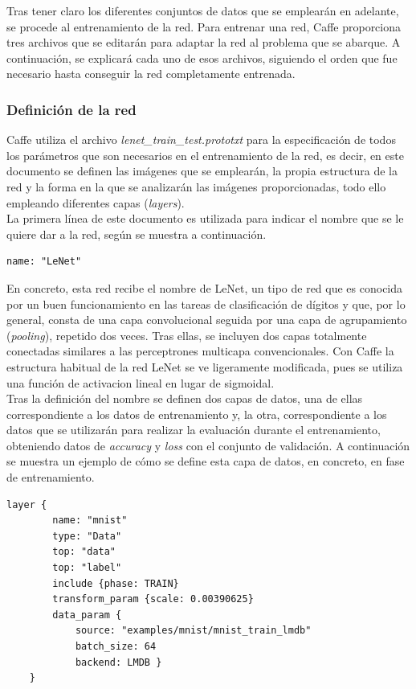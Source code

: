 Tras tener claro los diferentes conjuntos de datos que se emplearán en adelante, se procede al entrenamiento de la red. Para entrenar una red, Caffe proporciona tres archivos que se editarán para adaptar la red al problema que se abarque. A continuación, se explicará cada uno de esos archivos, siguiendo el orden que fue necesario hasta conseguir la red completamente entrenada.\\

\subsubsection{Definición de la red}
	Caffe utiliza el archivo 
	\textit{lenet\_train\_test.prototxt} para la especificación de todos los parámetros que son necesarios en el entrenamiento de la red, es decir, en este documento se definen las imágenes que se emplearán, la propia estructura de la red y la forma en la que se analizarán las imágenes proporcionadas, todo ello empleando diferentes capas (\textit{layers}).\\

	La primera línea de este documento es utilizada para indicar el nombre que se le quiere dar a la red, según se muestra a continuación.
	\vspace{10pt}
	\begin{lstlisting}[frame=single]
	name: "LeNet"
	\end{lstlisting}
	
	En concreto, esta red recibe el nombre de LeNet, un tipo de red que es conocida por un buen funcionamiento en las tareas de clasificación de dígitos y que, por lo general, consta de una capa convolucional seguida por una capa de agrupamiento (\textit{pooling}), repetido dos veces. Tras ellas, se incluyen dos capas totalmente conectadas similares a las perceptrones multicapa convencionales. Con Caffe la estructura habitual de la red LeNet se ve ligeramente modificada, pues se utiliza una función de activacion lineal en lugar de sigmoidal.\\

	Tras la definición del nombre se definen dos capas de datos, una de ellas correspondiente a los datos de entrenamiento y, la otra, correspondiente a los datos que se utilizarán para realizar la evaluación durante el entrenamiento, obteniendo datos de \textit{accuracy} y \textit{loss} con el conjunto de validación. A continuación se muestra un ejemplo de cómo se define esta capa de datos, en concreto, en fase de entrenamiento.
	\vspace{10pt}
	\begin{lstlisting}[frame=single]
	layer {
		name: "mnist"
		type: "Data"
		top: "data"
		top: "label"
		include {phase: TRAIN}
		transform_param {scale: 0.00390625}
		data_param {
			source: "examples/mnist/mnist_train_lmdb"
			batch_size: 64
			backend: LMDB }
	}
	\end{lstlisting}
	
